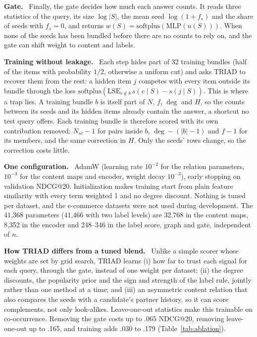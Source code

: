\documentclass[runningheads]{llncs}
\renewcommand{\paragraph}[1]{\smallskip\noindent\textbf{#1}\ }
\begin{document}
\paragraph{Gate.} Finally, the gate decides how much each answer counts. It reads three statistics of the query, its
size $\log|S|$, the mean seed $\log(1+f_s)$ and the share of seeds with $f_s=0$, and returns
$w(S)=\mathrm{softplus}(\mathrm{MLP}(u(S)))$. When none of the seeds has been bundled before there are no counts to
rely on, and the gate can shift weight to content and labels.

\paragraph{Training without leakage.} Each step hides part of 32 training bundles (half of the items with
probability $1/2$, otherwise a uniform cut) and asks TRIAD to recover them from the rest: a hidden item $j$ competes
with every item outside its bundle through the loss $\mathrm{softplus}(\mathrm{LSE}_{c\notin b}\,s(c\mid S)-s(j\mid
S))$. This is where a trap lies. A training bundle $b$ is itself part of $N$, $f$, $\deg$ and $H$, so the counts
between its seeds and its hidden items already contain the answer, a shortcut no test query offers. Each training
bundle is therefore scored with its own contribution removed: $N_{sc}-1$ for pairs inside $b$, $\deg-(|b|-1)$ and
$f-1$ for its members, and the same correction in $H$. Only the seeds' rows change, so the correction costs little.

\paragraph{One configuration.} AdamW \cite{adamw} (learning rate $10^{-2}$ for the relation parameters, $10^{-3}$ for
the content maps and encoder, weight decay $10^{-3}$), early stopping on validation NDCG@20. Initialization makes
training start from plain feature similarity with every term weighted 1 and no degree discount. Nothing is tuned per
dataset, and the e-commerce datasets were not used during development. The 41,368 parameters (41,466 with two label
levels) are 32,768 in the content maps, 8,352 in the encoder and 248--346 in the label score, graph and gate,
independent of $n$.

\paragraph{How TRIAD differs from a tuned blend.} Unlike a simple scorer whose weights are set by grid search,
TRIAD learns (i) how far to trust each signal for each query, through the gate, instead of one weight per dataset;
(ii) the degree discounts, the popularity prior and the sign and strength of the label rule, jointly rather than one
method at a time; and (iii) an asymmetric content relation that also compares the seeds with a candidate's partner
history, so it can score complements, not only look-alikes. Leave-one-out statistics make this trainable on co-occurrence.
Removing the gate costs up to .065 NDCG@20, removing leave-one-out up to .165, and training adds .030 to .179
(Table~\ref{tab:ablation}).
\end{document}
